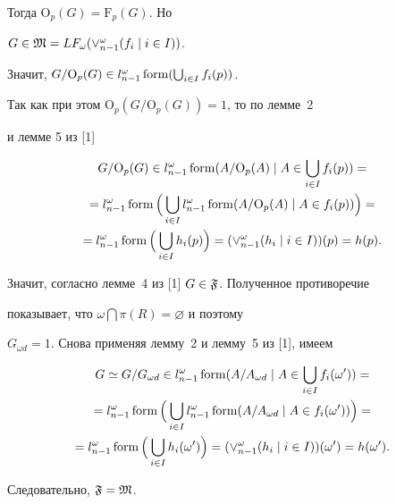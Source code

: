 \begin{pf}
Тогда ${\mathrm O}_p(G)={\mathrm F}_p(G)$. Но


$G\in\frak{M}=LF_{\omega}(\vee_{n-1}^{\omega}(f_i\mid i\in I))$.


Значит, $G/{\mathrm O}_p(G)\in l^{\omega}_{n-1}\operatorname{form} (\bigcup_{i\in I}f_i(p))$.


Так как при этом ${\mathrm O}_p(G/{\mathrm O}_p(G))=1$, то по лемме~2


и лемме 5 из [1]


\begin{multline*}


G/{\mathrm O}_p(G)\in l^{\omega}_{n-1}\form


(A/{\mathrm O}_p(A)\mid A\in\bigcup_{i\in I}f_i(p))= \\


=l^{\omega}_{n-1}\form \Big(\bigcup_{i\in I}l_{n-1}^{\omega}


\form (A/{\mathrm O}_p(A)\mid A\in f_i(p))\Big)= \\


=l_{n-1}^{\omega}\form \Big(\bigcup_{i\in I}h_i(p)\Big)=


(\vee_{n-1}^{\omega}(h_i\mid i\in I))(p)=h(p).


\end{multline*}


Значит, согласно лемме~4 из [1] $G\in\frak{F}$. Полученное противоречие


показывает, что $\omega\bigcap\pi(R)=\varnothing$ и поэтому


$G_{\omega d}=1$. Снова применяя лемму~2 и лемму~5 из [1], имеем


\begin{multline*}


G\simeq G/G_{\omega d}\in l^{\omega}_{n-1}\form


(A/A_{\omega d}\mid A\in\bigcup_{i\in I}f_i(\omega'))= \\


=l^{\omega}_{n-1}\form \Big(\bigcup_{i\in I}l_{n-1}^{\omega}


\form (A/A_{\omega d}\mid A\in f_i(\omega'))\Big)= \\


=l_{n-1}^{\omega}\form


\Big(\bigcup_{i\in I}h_i(\omega')\Big)=(\vee_{n-1}^{\omega}(h_i\mid


i\in I))(\omega')=h(\omega').


\end{multline*}


Следовательно, $\frak{F}=\frak{M}$.


\end{pf}





